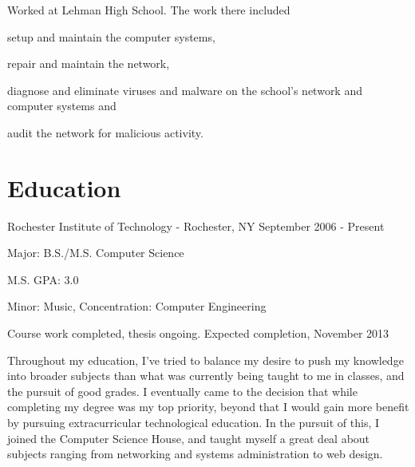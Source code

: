 \documentclass[a4paper,margin,line]{resume}
\newcommand{\rurl}[1]{\hfill {\footnotesize \url{#1}}}
\newcommand{\rdate}[1]{\hfill {\small #1}}
\renewcommand{\employer}[5]{\item[#1] - #2 \rdate{#3} \\* #4 \rurl{#5} \\*}
\begin{document}
\begin{resume}
\begin{asparadesc}
		\small
		Worked at Lehman High School. The work there included \begin{inparaenum} \item setup and maintain the computer systems, \item repair and maintain the network, \item diagnose and eliminate viruses and malware on the school's network and computer systems and \item audit the network for malicious activity. \end{inparaenum}
		\normalsize
%		
	\end{asparadesc}

\section{\mysidestyle Education}
	\begin{compactdesc}
		\item[Rochester Institute of Technology] - Rochester, NY \rdate{September 2006 - Present}
		\begin{compactitem} { \small
			\item Major: B.S./M.S. Computer Science
			\item M.S. GPA: 3.0
			\item Minor: Music, Concentration: Computer Engineering
			\item Course work completed, thesis ongoing. Expected completion, November 2013
		} \end{compactitem}
	\end{compactdesc}

	\small
	Throughout my education, I've tried to balance my desire to push my
	knowledge into broader subjects than what was currently being taught to me
	in classes, and the pursuit of good grades. I eventually came to the
	decision that while completing my degree was my top priority, beyond that I
	would gain more benefit by pursuing extracurricular technological education.
	In the pursuit of this, I joined the Computer Science House, and taught
	myself a great deal about subjects ranging from networking and systems
	administration to web design.


\end{resume}
\end{document}
